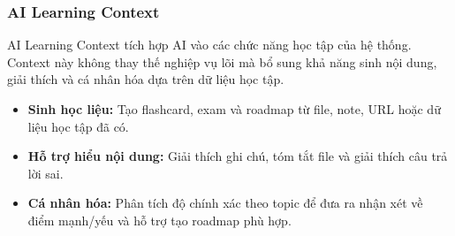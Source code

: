 \subsubsection{AI Learning Context}
\label{subsubsec:ai-learning-context}

AI Learning Context tích hợp AI vào các chức năng học tập của hệ thống. Context này không thay thế nghiệp vụ lõi mà bổ sung khả năng sinh nội dung, giải thích và cá nhân hóa dựa trên dữ liệu học tập.

\begin{itemize}
    \item \textbf{Sinh học liệu:} Tạo flashcard, exam và roadmap từ file, note, URL hoặc dữ liệu học tập đã có.
    \item \textbf{Hỗ trợ hiểu nội dung:} Giải thích ghi chú, tóm tắt file và giải thích câu trả lời sai.
    \item \textbf{Cá nhân hóa:} Phân tích độ chính xác theo topic để đưa ra nhận xét về điểm mạnh/yếu và hỗ trợ tạo roadmap phù hợp.
\end{itemize}